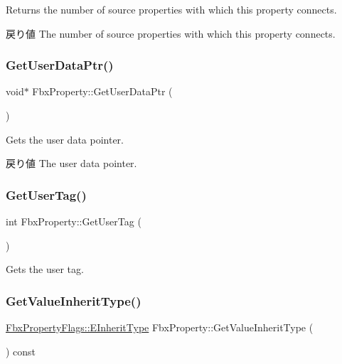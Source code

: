 Returns the number of source properties with which this property connects. \begin{DoxyReturn}{戻り値}
The number of source properties with which this property connects. 
\end{DoxyReturn}
\mbox{\label{class_fbx_property_a4d1057bd2c1b78585aad480c88a40a11}} 
\subsubsection{\texorpdfstring{Get\+User\+Data\+Ptr()}{GetUserDataPtr()}}
{\footnotesize\ttfamily void$\ast$ Fbx\+Property\+::\+Get\+User\+Data\+Ptr (\begin{DoxyParamCaption}{ }\end{DoxyParamCaption})}

Gets the user data pointer. \begin{DoxyReturn}{戻り値}
The user data pointer. 
\end{DoxyReturn}
\mbox{\label{class_fbx_property_a346536ecdb6cc2178105ed4fc30b80fc}} 
\subsubsection{\texorpdfstring{Get\+User\+Tag()}{GetUserTag()}}
{\footnotesize\ttfamily int Fbx\+Property\+::\+Get\+User\+Tag (\begin{DoxyParamCaption}{ }\end{DoxyParamCaption})}



Gets the user tag. 

\mbox{\label{class_fbx_property_aee557d7603e73430d4034a03b631b75e}} 
\subsubsection{\texorpdfstring{Get\+Value\+Inherit\+Type()}{GetValueInheritType()}}
{\footnotesize\ttfamily \hyperlink{class_fbx_property_flags_ae3b667a4fcac4b827fa186a698fec2f8}{Fbx\+Property\+Flags\+::\+E\+Inherit\+Type} Fbx\+Property\+::\+Get\+Value\+Inherit\+Type (\begin{DoxyParamCaption}{ }\end{DoxyParamCaption}) const}

